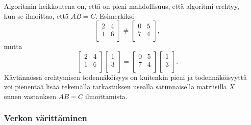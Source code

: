Algoritmin heikkoutena on, että on pieni mahdollisuus,
että algoritmi erehtyy, kun se ilmoittaa, että $AB=C$.
Esimerkiksi 
\[
 \begin{bmatrix}
  2 & 4 \\
  1 & 6 \\
 \end{bmatrix}
\neq
 \begin{bmatrix}
  0 & 5 \\
  7 & 4 \\
 \end{bmatrix},
\]
mutta
\[
 \begin{bmatrix}
  2 & 4 \\
  1 & 6 \\
 \end{bmatrix}
 \begin{bmatrix}
  1 \\
  3 \\
 \end{bmatrix}
=
 \begin{bmatrix}
  0 & 5 \\
  7 & 4 \\
 \end{bmatrix}
 \begin{bmatrix}
  1 \\
  3 \\
 \end{bmatrix}.
\]
Käytännössä erehtymisen todennäköisyys on kuitenkin
pieni ja todennäköisyyttä voi pienentää lisää
tekemällä tarkastuksen usealla
satunnaisella matriisilla $X$ ennen vastauksen
$AB=C$ ilmoittamista.

\subsubsection{Verkon värittäminen}


